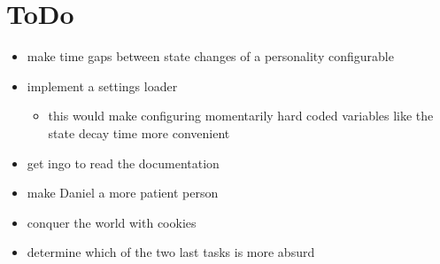 \section{ToDo}
\begin{itemize}
    \item make time gaps between state changes of a personality configurable
    \item implement a settings loader
    \begin{itemize}
        \item this would make configuring momentarily hard coded variables like the state decay time more convenient
    \end{itemize}
    \item get ingo to read the documentation
    \item make Daniel a more patient person
    \item conquer the world with cookies 
    \item determine which of the two last tasks is more absurd
\end{itemize}
